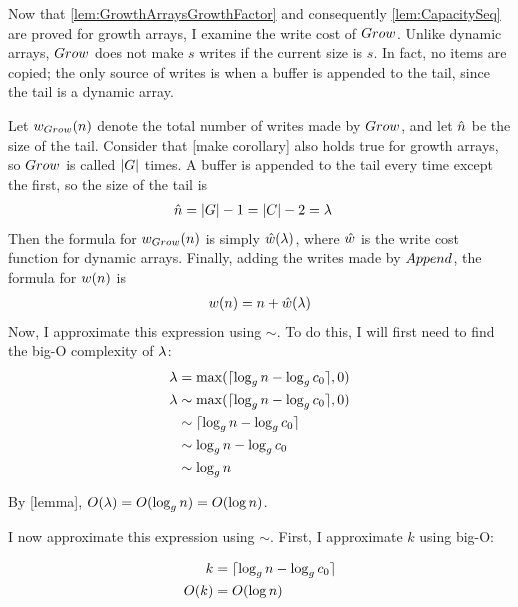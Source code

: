 Now that \ref{lem:GrowthArraysGrowthFactor} and consequently \ref{lem:CapacitySeq} are proved for growth arrays, I examine the write cost of $Grow$. Unlike dynamic arrays, $Grow$ does not make $s$ writes if the current size is $s$. In fact, no items are copied; the only source of writes is when a buffer is appended to the tail, since the tail is a dynamic array.

Let ${w}_{Grow}(n)$ denote the total number of writes made by $Grow$, and let $\hat{n}$ be the size of the tail. Consider that [make corollary] also holds true for growth arrays, so $Grow$ is called $|G|$ times. A buffer is appended to the tail every time except the first, so the size of the tail is
\begin{align*}
\hat{n} &= |G| - 1 = |C| - 2 = \lambda
\end{align*}
Then the formula for ${w}_{Grow}(n)$ is simply $\hat{w}(\lambda)$, where $\hat{w}$ is the write cost function for dynamic arrays. Finally, adding the writes made by $Append$, the formula for $w(n)$ is
\begin{align*}
w(n) = n + \hat{w}(\lambda)
\end{align*}
Now, I approximate this expression using $\sim$. To do this, I will first need to find the big-O complexity of $\lambda$:
\begin{align*}
\lambda &= \max(\lceil \log_{g} n - \log_{g} c_0 \rceil, 0)\\
\lambda &\sim \max(\lceil \log_{g} n - \log_{g} c_0 \rceil, 0)\\
&\sim \lceil \log_{g} n - \log_{g} c_0 \rceil\\
&\sim \log_{g} n - \log_{g} c_0\\
&\sim \log_{g} n
\end{align*}

By [lemma], $O(\lambda) = O(\log_{g} n) = O(\log n)$.


I now approximate this expression using $\sim$. First, I approximate $k$ using big-O:

\begin{align*}
k &= \lceil \log_{g} n - \log_{g} c_0 \rceil\\
O(k) &= O(\log n)
\end{align*}


